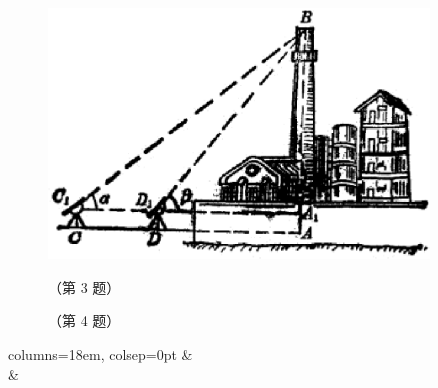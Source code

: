 \begin{xiaotis}
\begin{figure}[htbp]
    \centering
    \begin{minipage}[b]{8cm}
        \centering
        \includegraphics[width=0.9\textwidth]{../pic/czds4-ch15-subsec10-lianxi-3}
        \caption*{（第 3 题）}
    \end{minipage}
    \qquad
    \begin{minipage}[b]{6cm}
        \centering
        
        \caption*{（第 4 题）}
    \end{minipage}
\end{figure}


\begin{xiaoxiaotis}

    \begin{tblr}{columns={18em, colsep=0pt}}
         &  \\
         & 
    \end{tblr}
\end{xiaoxiaotis}

\end{xiaotis}
